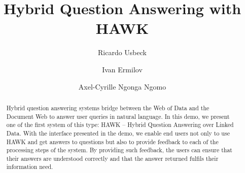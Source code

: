 \documentclass{llncs}
\begin{document}
\title{Hybrid Question Answering with HAWK}
\author{
Ricardo Usbeck \and 
Ivan Ermilov \and
Axel-Cyrille Ngonga Ngomo
}


\maketitle

\begin{abstract}
Hybrid question answering systems bridge between the Web of Data and the Document Web to answer user queries in natural language. In this demo, we present one of the first system of this type: HAWK -- Hybrid Question Answering over Linked Data. With the interface presented in the demo, we enable end users not only to use HAWK and get answers to questions but also to provide feedback to each of the processing steps of the system. By providing such feedback, the users can ensure that their answers are understood correctly and that the answer returned fulfils their information need.   

\end{abstract}
\end{document}
